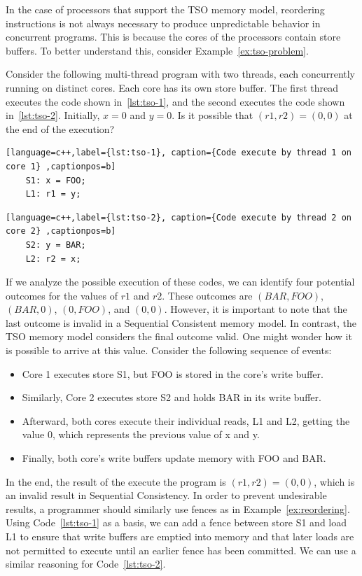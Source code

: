 In the case of processors that support the TSO memory model, reordering instructions is not always necessary to produce unpredictable behavior in concurrent programs. This is because the cores of the processors contain store buffers. To better understand this, consider Example~\ref{ex:tso-problem}.

\begin{example}
  \label{ex:tso-problem}

  Consider the following multi-thread program with two threads, each concurrently running on distinct cores. Each core has its own store buffer. The first thread executes the code shown in~\ref{lst:tso-1}, and the second executes the code shown in~\ref{lst:tso-2}. Initially, \(x = 0\) and \(y = 0\). Is it possible that \((r1, r2) = (0, 0)\) at the end of the execution?

  \begin{lstlisting}[language=c++,label={lst:tso-1}, caption={Code execute by thread 1 on core 1} ,captionpos=b]
    S1: x = FOO;
    L1: r1 = y;
\end{lstlisting}

\begin{lstlisting}[language=c++,label={lst:tso-2}, caption={Code execute by thread 2 on core 2} ,captionpos=b]
    S2: y = BAR;
    L2: r2 = x;
\end{lstlisting}

  If we analyze the possible execution of these codes, we can identify four potential outcomes for the values of \(r1\) and \(r2\). These outcomes are \((BAR, FOO)\), \((BAR, 0)\), \((0, FOO)\), and \((0, 0)\). However, it is important to note that the last outcome is invalid in a Sequential Consistent memory model. In contrast, the TSO memory model considers the final outcome valid. One might wonder how it is possible to arrive at this value. Consider the following sequence of events:

  \begin{itemize}
    \item Core 1 executes store S1, but FOO is stored in the core's write buffer.
    \item Similarly, Core 2 executes store S2 and holds BAR in its write buffer.
    \item Afterward, both cores execute their individual reads, L1 and L2, getting the value 0, which represents the previous value of x and y.
    \item Finally, both core's write buffers update memory with FOO and BAR.
    \end{itemize}

    In the end, the result of the execute the program is \((r1, r2) = (0, 0)\), which is an invalid result in Sequential Consistency. In order to prevent undesirable results, a programmer should similarly use fences as in Example~\ref{ex:reordering}. Using Code~\ref{lst:tso-1} as a basis, we can add a fence between store S1 and load L1 to ensure that write buffers are emptied into memory and that later loads are not permitted to execute until an earlier fence has been committed. We can use a similar reasoning for Code~\ref{lst:tso-2}.

\end{example}


